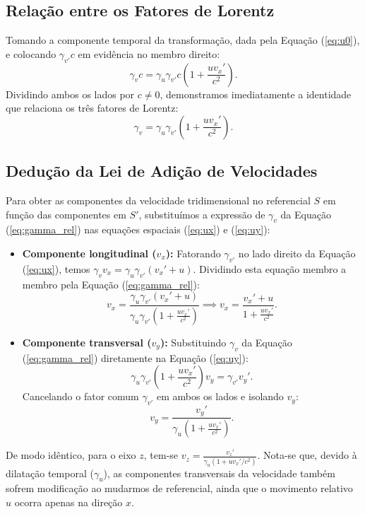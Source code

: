 \documentclass[11pt, a4paper]{article}
\begin{document}
\subsection{Relação entre os Fatores de Lorentz}

Tomando a componente temporal da transformação, dada pela Equação (\ref{eq:u0}), e colocando $\gamma_{v'} c$ em evidência no membro direito:
\begin{equation}
\gamma_v c = \gamma_u \gamma_{v'} c \left( 1 + \frac{u v_x'}{c^2} \right).
\end{equation}
Dividindo ambos os lados por $c \neq 0$, demonstramos imediatamente a identidade que relaciona os três fatores de Lorentz:
\begin{equation}
\gamma_v = \gamma_u \gamma_{v'} \left( 1 + \frac{u v_x'}{c^2} \right). \label{eq:gamma_rel}
\end{equation}

\subsection{Dedução da Lei de Adição de Velocidades}

Para obter as componentes da velocidade tridimensional no referencial $S$ em função das componentes em $S'$, substituímos a expressão de $\gamma_v$ da Equação (\ref{eq:gamma_rel}) nas equações espaciais (\ref{eq:ux}) e (\ref{eq:uy}):

\begin{itemize}
    \item \textbf{Componente longitudinal ($v_x$):} Fatorando $\gamma_{v'}$ no lado direito da Equação (\ref{eq:ux}), temos $\gamma_v v_x = \gamma_u \gamma_{v'} (v_x' + u)$. Dividindo esta equação membro a membro pela Equação (\ref{eq:gamma_rel}):
    \begin{equation}
    v_x = \frac{\gamma_u \gamma_{v'} (v_x' + u)}{\gamma_u \gamma_{v'} \left( 1 + \frac{u v_x'}{c^2} \right)} \implies v_x = \frac{v_x' + u}{1 + \frac{u v_x'}{c^2}}.
    \end{equation}

    \item \textbf{Componente transversal ($v_y$):} Substituindo $\gamma_v$ da Equação (\ref{eq:gamma_rel}) diretamente na Equação (\ref{eq:uy}):
    \begin{equation}
    \gamma_u \gamma_{v'} \left( 1 + \frac{u v_x'}{c^2} \right) v_y = \gamma_{v'} v_y'.
    \end{equation}
    Cancelando o fator comum $\gamma_{v'}$ em ambos os lados e isolando $v_y$:
    \begin{equation}
    v_y = \frac{v_y'}{\gamma_u \left( 1 + \frac{u v_x'}{c^2} \right)}.
    \end{equation}
\end{itemize}
De modo idêntico, para o eixo $z$, tem-se $v_z = \frac{v_z'}{\gamma_u (1 + u v_x'/c^2)}$. Nota-se que, devido à dilatação temporal ($\gamma_u$), as componentes transversais da velocidade também sofrem modificação ao mudarmos de referencial, ainda que o movimento relativo $u$ ocorra apenas na direção $x$.
\end{document}
